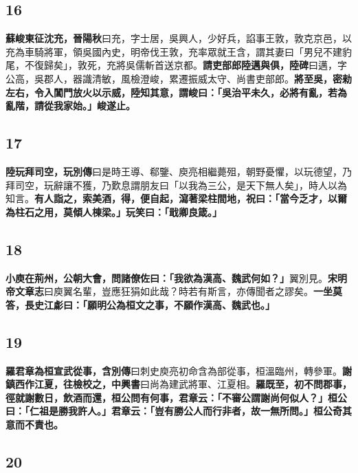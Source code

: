 \subsection*{16}

\textbf{蘇峻東征沈充，}{\footnotesize \textbf{晉陽秋}曰充，字士居，吳興人，少好兵，諂事王敦，敦克京邑，以充為車騎將軍，領吳國內史，明帝伐王敦，充率眾就王含，謂其妻曰「男兒不建豹尾，不復歸矣」，敦死，充將吳儒斬首送京都。}\textbf{請吏部郎陸邁與俱，}{\footnotesize \textbf{陸碑}曰邁，字公高，吳郡人，器識清敏，風檢澄峻，累遷振威太守、尚書吏部郎。}\textbf{將至吳，密勑左右，令入閶門放火以示威，陸知其意，謂峻曰：「吳治平未久，必將有亂，若為亂階，請從我家始。」峻遂止。}

\subsection*{17}

\textbf{陸玩拜司空，}{\footnotesize \textbf{玩別傳}曰是時王導、郗鑒、庾亮相繼薨殂，朝野憂懼，以玩德望，乃拜司空，玩辭讓不獲，乃歎息謂朋友曰「以我為三公，是天下無人矣」，時人以為知言。}\textbf{有人詣之，索美酒，得，便自起，瀉著梁柱間地，祝曰：「當今乏才，以爾為柱石之用，莫傾人棟梁。」玩笑曰：「戢卿良箴。」}

\subsection*{18}

\textbf{小庾在荊州，公朝大會，問諸僚佐曰：「我欲為漢高、魏武何如？」}{\footnotesize 翼別見。\textbf{宋明帝文章志}曰庾翼名輩，豈應狂狷如此哉？時若有斯言，亦傳聞者之謬矣。}\textbf{一坐莫答，長史江虨曰：「願明公為桓文之事，不願作漢高、魏武也。」}

\subsection*{19}

\textbf{羅君章為桓宣武從事，}{\footnotesize \textbf{含別傳}曰刺史庾亮初命含為部從事，桓溫臨州，轉參軍。}\textbf{謝鎮西作江夏，往檢校之，}{\footnotesize \textbf{中興書}曰尚為建武將軍、江夏相。}\textbf{羅既至，初不問郡事，徑就謝數日，飲酒而還，桓公問有何事，君章云：「不審公謂謝尚何似人？」桓公曰：「仁祖是勝我許人。」君章云：「豈有勝公人而行非者，故一無所問。」桓公奇其意而不責也。}

\subsection*{20}

